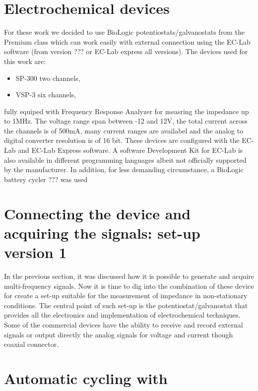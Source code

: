 \section{Electrochemical devices}
For these work we decided to use BioLogic potentiostats/galvanostats from the Premium class which can work easily with external connection using the EC-Lab software (from version ??? or EC-Lab express all versions). The devices used for this work are:
\begin{itemize}
    \item SP-300 two channels,
    \item VSP-3 six channels,
\end{itemize}
fully equiped with Frequency Response Analyzer for measring the impedance up to 1MHz. The voltage range span between -12 and 12V, the total current across the channels is of 500mA, many current ranges are availabel and the analog to digital converter resolution is of 16 bit. These devices are configured with the EC-Lab and EC-Lab Express software. A software Development Kit for EC-Lab is also available in different programming languages albeit not officially supported by the manufacturer.
In addition, for less demanding circumstance, a BioLogic battery cycler ??? was used



\section{Connecting the device and acquiring the signals: set-up version 1}
In the previous section, it was discussed how it is possible to generate and acquire multi-frequency signals. Now it is time to dig into the combination of these device for create a set-up suitable for the measurement of impedance in non-stationary conditions. The central point of such set-up is the potentiostat/galvanostat that provides all the electronics and implementation of electrochemical techniques. Some of the commercial devices have the ability to receive and record external signals or output directly the analog signals for voltage and current though coaxial connector. 

\section{Automatic cycling with}